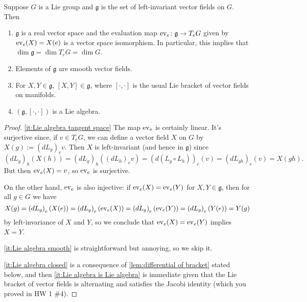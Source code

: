 \begin{theorem}\label{thm:Lie algebra of Lie group}
	Suppose $G$ is a Lie group and $\mathfrak{g}$ is the set of left-invariant vector fields on $G$. Then
	\begin{enumerate}
		\item \label{it:Lie algebra tangent space} $\mathfrak{g}$ is a real vector space and the evaluation map $\operatorname{ev}_e \colon\thinspace\!  \mathfrak{g} \to T_eG$ given by $\operatorname{ev}_e(X) = X(e)$ is a vector space isomorphism. In particular, this implies that $\dim \mathfrak{g} = \dim T_eG = \dim G$.
		\item \label{it:Lie algebra smooth} Elements of $\mathfrak{g}$ are smooth vector fields.
		\item \label{it:Lie algebra closed} For $X,Y \in \mathfrak{g}$, $[X,Y] \in \mathfrak{g}$, where $[ \cdot , \cdot]$ is the usual Lie bracket of vector fields on manifolds.
		\item \label{it:Lie algebra is Lie algebra} $(\mathfrak{g}, [ \cdot , \cdot])$ is a Lie algebra.
	\end{enumerate}
\end{theorem}

\begin{proof}
	\ref{it:Lie algebra tangent space} The map $\operatorname{ev}_e$ is certainly linear. It's surjective since, if $v \in T_eG$, we can define a vector field $X$ on $G$ by $X(g):= \left(dL_g\right)_e v$. Then $X$ is left-invariant (and hence in $\mathfrak{g}$) since
	\[
		\left(dL_g\right)_h(X(h)) = \left(dL_g\right)_h \left(\left(dL_h\right)_ev\right) = \left(d\left(L_g \circ L_h\right)\right)_e(v) = \left(d L_{gh}\right)_e(v) = X(gh).
	\]
	But then $\operatorname{ev}_e(X) = v$, so $\operatorname{ev}_e$ is surjective.
	
	On the other hand, $\operatorname{ev}_e$ is also injective: if $\operatorname{ev}_e(X) = \operatorname{ev}_e(Y)$ for $X,Y \in \mathfrak{g}$, then for all $g \in G$ we have
	\[
		X(g) = \left(dL_g\right)_e (X(e)) = \left(dL_g\right)_e (\operatorname{ev}_e(X)) = \left(dL_g\right)_e (\operatorname{ev}_e(Y)) = \left(dL_g\right)_e (Y(e)) = Y(g)
	\]
	by left-invariance of $X$ and $Y$, so we conclude that $\operatorname{ev}_e(X) = \operatorname{ev}_e(Y)$ implies $X=Y$.
	
	\ref{it:Lie algebra smooth} is straightforward but annoying, so we skip it.
	
	\ref{it:Lie algebra closed} is a consequence of \ref{lem:differential of bracket} stated below, and then \ref{it:Lie algebra is Lie algebra} is immediate given that the Lie bracket of vector fields is alternating and satisfies the Jacobi identity (which you proved in HW 1 \#4).
\end{proof}

